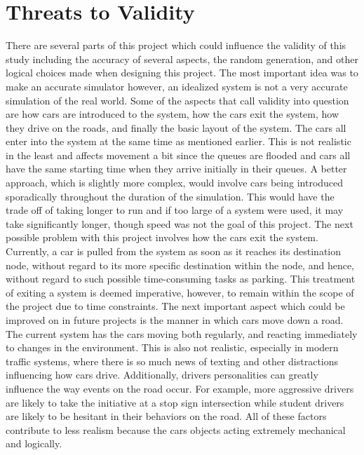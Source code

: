 \section{Threats to Validity}

There are several parts of this project which could influence the validity of this study including the accuracy of several aspects, the random generation, and other logical choices made when designing this project.  The most important idea was to make an accurate simulator however, an idealized system is not a very accurate simulation of the real world.  Some of the aspects that call validity into question are how cars are introduced to the system, how the cars exit the system, how they drive on the roads, and finally the basic layout of the system.  The cars all enter into the system at the same time as mentioned earlier.  This is not realistic in the least and affects movement a bit since the queues are flooded and cars all have the same starting time when they arrive initially in their queues.  A better approach, which is slightly more complex, would involve cars being introduced sporadically throughout the duration of the simulation.  This would have the trade off of taking longer to run and if too large of a system were used, it may take significantly longer, though speed was not the goal of this project.  The next possible problem with this project involves how the cars exit the system.  Currently, a car is pulled from the system as soon as it reaches its destination node, without regard to its more specific destination within the node, and hence, without regard to such possible time-consuming tasks as parking.  This treatment of exiting a system is deemed imperative, however, to remain within the scope of the project due to time constraints.  The next important aspect which could be improved on in future projects is the manner in which cars move down a road.  The current system has the cars moving both regularly, and reacting immediately to changes in the environment.  This is also not realistic, especially in modern traffic systems, where there is so much news of texting and other distractions influencing how cars drive.  Additionally, drivers personalities can greatly influence the way events on the road occur.  For example, more aggressive drivers are likely to take the initiative at a stop sign intersection while student drivers are likely to be hesitant in their behaviors on the road.  All of these factors contribute to less realism because the cars objects acting extremely mechanical and logically.  

